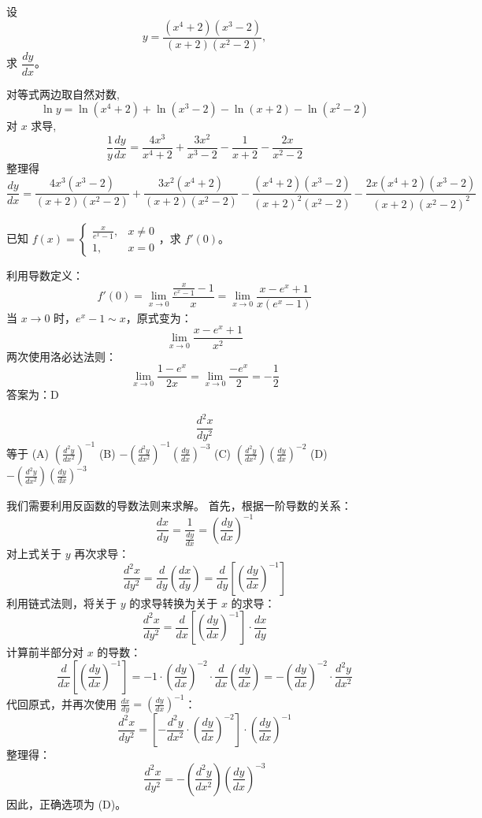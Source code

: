 \begin{questions}
    \question 设 
    \[
    y = \frac{(x^4 + 2)(x^3 - 2)}{(x + 2)(x^2 - 2)},
    \]
    求 $\dfrac{dy}{dx}$。
    \begin{solution}
        对等式两边取自然对数,
        \[ 
        \ln y = \ln(x^4 + 2) + \ln(x^3 - 2) - \ln(x + 2) - \ln(x^2 - 2) 
        \]
        对 $x$ 求导,
        \[ 
        \frac{1}{y} \frac{dy}{dx} = \frac{4x^3}{x^4 + 2} + \frac{3x^2}{x^3 - 2} - \frac{1}{x + 2} - \frac{2x}{x^2 - 2} 
        \]
        整理得
        \[ 
        \frac{dy}{dx} = \frac{4x^3(x^3 - 2)}{(x + 2)(x^2 - 2)} + \frac{3x^2(x^4 + 2)}{(x + 2)(x^2 - 2)} - \frac{(x^4 + 2)(x^3 - 2)}{(x + 2)^2(x^2 - 2)} - \frac{2x(x^4 + 2)(x^3 - 2)}{(x + 2)(x^2 - 2)^2} 
        \]
    \end{solution}

    \question 已知 $f(x) = \begin{cases} \frac{x}{e^x - 1}, & x \neq 0 \\ 1, & x = 0 \end{cases}$，求 $f'(0)$。

\begin{solution}
利用导数定义：
\[
f'(0) = \lim_{x \to 0} \frac{\frac{x}{e^x - 1} - 1}{x} = \lim_{x \to 0} \frac{x - e^x + 1}{x(e^x - 1)}
\]
当 $x \to 0$ 时，$e^x - 1 \sim x$，原式变为：
\[
\lim_{x \to 0} \frac{x - e^x + 1}{x^2}
\]
两次使用洛必达法则：
\[
\lim_{x \to 0} \frac{1 - e^x}{2x} = \lim_{x \to 0} \frac{-e^x}{2} = -\frac{1}{2}
\]
答案为：D
\end{solution}

\question
\[
\frac{d^2x}{dy^2}
\]
等于
(A) $\left( \frac{d^2y}{dx^2} \right)^{-1}$
(B) $-\left( \frac{d^2y}{dx^2} \right)^{-1} \left( \frac{dy}{dx} \right)^{-3}$
(C) $\left( \frac{d^2y}{dx^2} \right) \left( \frac{dy}{dx} \right)^{-2}$
(D) $-\left( \frac{d^2y}{dx^2} \right) \left( \frac{dy}{dx} \right)^{-3}$

\begin{solution}
我们需要利用反函数的导数法则来求解。
首先，根据一阶导数的关系：
\[
\frac{dx}{dy} = \frac{1}{\frac{dy}{dx}} = \left( \frac{dy}{dx} \right)^{-1}
\]
对上式关于 $y$ 再次求导：
\[
\frac{d^2x}{dy^2} = \frac{d}{dy} \left( \frac{dx}{dy} \right) = \frac{d}{dy} \left[ \left( \frac{dy}{dx} \right)^{-1} \right]
\]
利用链式法则，将关于 $y$ 的求导转换为关于 $x$ 的求导：
\[
\frac{d^2x}{dy^2} = \frac{d}{dx} \left[ \left( \frac{dy}{dx} \right)^{-1} \right] \cdot \frac{dx}{dy}
\]
计算前半部分对 $x$ 的导数：
\[
\frac{d}{dx} \left[ \left( \frac{dy}{dx} \right)^{-1} \right] = -1 \cdot \left( \frac{dy}{dx} \right)^{-2} \cdot \frac{d}{dx} \left( \frac{dy}{dx} \right) = - \left( \frac{dy}{dx} \right)^{-2} \cdot \frac{d^2y}{dx^2}
\]
代回原式，并再次使用 $\frac{dx}{dy} = \left( \frac{dy}{dx} \right)^{-1}$：
\[
\frac{d^2x}{dy^2} = \left[ - \frac{d^2y}{dx^2} \cdot \left( \frac{dy}{dx} \right)^{-2} \right] \cdot \left( \frac{dy}{dx} \right)^{-1}
\]
整理得：
\[
\frac{d^2x}{dy^2} = - \left( \frac{d^2y}{dx^2} \right) \left( \frac{dy}{dx} \right)^{-3}
\]
因此，正确选项为 (D)。
\end{solution}


\end{questions}
